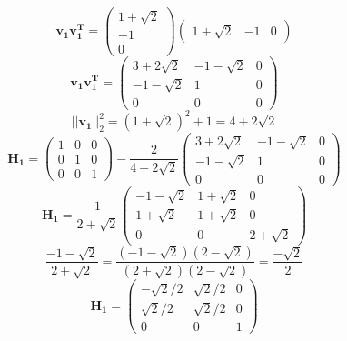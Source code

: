\documentclass{article} %
\begin{document}
\begin{equation}
\boldsymbol{v_1v_1^T} = \begin{pmatrix} 1 + \sqrt{2} \\ -1 \\ 0 \end{pmatrix} \begin{pmatrix} 1 + \sqrt{2} & -1 & 0 \end{pmatrix}
\end{equation}
\begin{equation}
\boldsymbol{v_1v_1^T} = \begin{pmatrix} 3 + 2\sqrt{2} & -1 - \sqrt{2} & 0 \\
 -1 - \sqrt{2} & 1 & 0 \\
  0 & 0 & 0 \end{pmatrix} 
\end{equation}
\begin{equation}
||\boldsymbol{v_1}||_2^2 = (1+\sqrt{2})^2 + 1 = 4 + 2\sqrt{2}
\end{equation}
\begin{equation}
\boldsymbol{H_1} = \begin{pmatrix} 1 & 0 & 0 \\ 0 & 1 & 0 \\ 0 & 0 & 1 \end{pmatrix}  - \frac{2}{4 + 2\sqrt{2}} \begin{pmatrix} 3 + 2\sqrt{2} & -1 - \sqrt{2} & 0 \\
 -1 - \sqrt{2} & 1 & 0 \\
  0 & 0 & 0 \end{pmatrix} 
\end{equation}
\begin{equation}
\boldsymbol{H_1} = \frac{1}{2 + \sqrt{2}} \begin{pmatrix} -1 - \sqrt{2} & 1 + \sqrt{2} & 0 \\
 1 + \sqrt{2} & 1 + \sqrt{2} & 0 \\
  0 & 0 & 2 + \sqrt{2} \end{pmatrix} 
\end{equation}
\begin{equation}
\frac{-1-\sqrt{2}}{2+\sqrt{2}} = \frac{(-1-\sqrt{2})(2-\sqrt{2})}{(2+\sqrt{2})(2-\sqrt{2})}=\frac{-\sqrt2}{2}
\end{equation}
\begin{equation}
\boldsymbol{H_1} = \begin{pmatrix} -\sqrt{2}/2 & \sqrt{2}/2 & 0 \\
 \sqrt{2}/2 & \sqrt{2}/2 & 0 \\
  0 & 0 & 1 \end{pmatrix} 
\end{equation}
\end{document}
